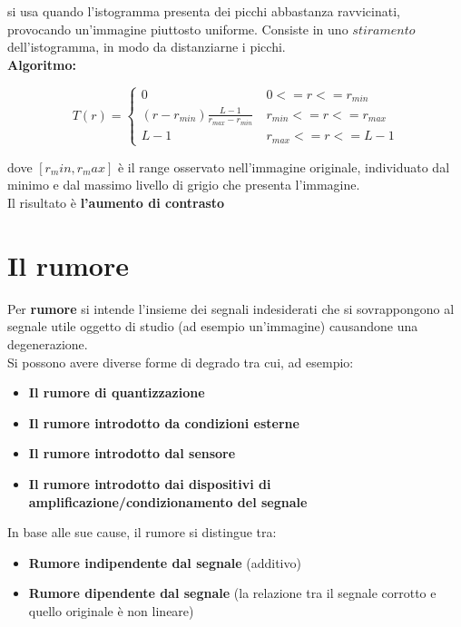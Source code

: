 si usa quando l’istogramma presenta dei picchi abbastanza ravvicinati, provocando un’immagine
piuttosto uniforme. Consiste in uno $stiramento$ dell’istogramma, in modo da distanziarne i picchi.
\\\textbf{Algoritmo:}
\begin{center}
    $$
        T(r) = \left\{ \begin{array}{cl}
            0                                         & \ 0 <= r <= r_{min}       \\
            (r - r_{min}) \frac{L-1}{r_{max}-r_{min}} & \ r_{min} <= r <= r_{max} \\
            L-1                                       & \ r_{max} <= r <= L-1
        \end{array} \right.
    $$
\end{center}
dove $[r_min, r_max ]$ è il range osservato nell’immagine originale, individuato dal minimo e dal massimo livello di grigio che presenta
l’immagine.
\\Il risultato è \textbf{l'aumento di contrasto}
\section{Il rumore}
Per \textbf{rumore} si intende l’insieme dei segnali indesiderati che si
sovrappongono al segnale utile oggetto di studio (ad esempio
un’immagine) causandone una degenerazione.
\\
Si possono avere diverse forme di degrado tra cui, ad esempio:
\begin{itemize}
    \item \textbf{Il rumore di quantizzazione}
    \item \textbf{Il rumore introdotto da condizioni esterne}
    \item \textbf{Il rumore introdotto dal sensore}
    \item \textbf{Il rumore introdotto dai dispositivi di amplificazione/condizionamento del segnale}
\end{itemize}

In base alle sue cause, il rumore si distingue tra:
\begin{itemize}
    \item \textbf{Rumore indipendente dal segnale} (additivo)
    \item \textbf{Rumore dipendente dal segnale} (la relazione tra il segnale corrotto e quello originale è non lineare)
\end{itemize}

